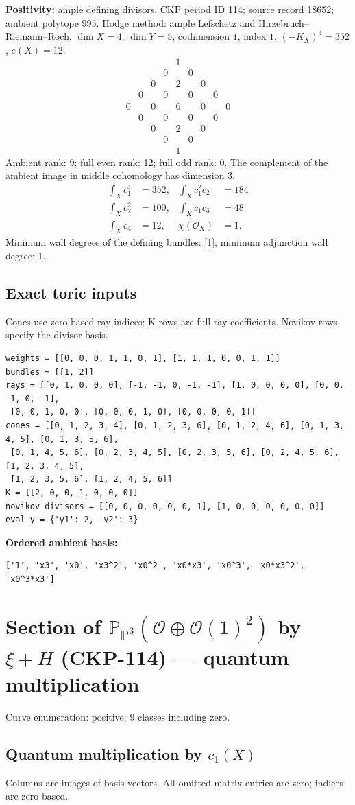 \documentclass[10pt,a4paper]{article}
\newcommand{\hodge}[4]{\begin{array}{ccccccccc}
&&&&1&&&&\\&&&0&&0&&&\\&&0&&#1&&0&&\\&0&&#2&&#2&&0&\\
0&&#3&&#4&&#3&&0\\&0&&#2&&#2&&0&\\&&0&&#1&&0&&\\&&&0&&0&&&\\&&&&1&&&&\end{array}}
\begin{document}
\textbf{Positivity:} ample defining divisors.
CKP period ID 114; source record 18652; ambient polytope 995.
Hodge method: ample Lefschetz and Hirzebruch--Riemann--Roch.
$\dim X=4$, $\dim Y=5$, codimension $1$, index $1$, $(-K_X)^4=352$, $e(X)=12$.
\[\hodge{2}{0}{0}{6}\]
Ambient rank: 9; full even rank: 12; full odd rank: 0. The complement of the ambient image in middle cohomology has dimension 3.
\[\begin{aligned}\int_Xc_1^4&=352,&\int_Xc_1^2c_2&=184\\\int_Xc_2^2&=100,&\int_Xc_1c_3&=48\\\int_Xc_4&=12,&\chi(\mathcal O_X)&=1.\end{aligned}\]
Minimum wall degrees of the defining bundles: [1]; minimum adjunction wall degree: 1.
\subsection*{Exact toric inputs}
Cones use zero-based ray indices; K rows are full ray coefficients. Novikov rows specify the divisor basis.

\begin{lstlisting}
weights = [[0, 0, 0, 1, 1, 0, 1], [1, 1, 1, 0, 0, 1, 1]]
bundles = [[1, 2]]
rays = [[0, 1, 0, 0, 0], [-1, -1, 0, -1, -1], [1, 0, 0, 0, 0], [0, 0, -1, 0, -1],
 [0, 0, 1, 0, 0], [0, 0, 0, 1, 0], [0, 0, 0, 0, 1]]
cones = [[0, 1, 2, 3, 4], [0, 1, 2, 3, 6], [0, 1, 2, 4, 6], [0, 1, 3, 4, 5], [0, 1, 3, 5, 6],
 [0, 1, 4, 5, 6], [0, 2, 3, 4, 5], [0, 2, 3, 5, 6], [0, 2, 4, 5, 6], [1, 2, 3, 4, 5],
 [1, 2, 3, 5, 6], [1, 2, 4, 5, 6]]
K = [[2, 0, 0, 1, 0, 0, 0]]
novikov_divisors = [[0, 0, 0, 0, 0, 0, 1], [1, 0, 0, 0, 0, 0, 0]]
eval_y = {'y1': 2, 'y2': 3}
\end{lstlisting}

\textbf{Ordered ambient basis:}
\begin{lstlisting}
['1', 'x3', 'x0', 'x3^2', 'x0^2', 'x0*x3', 'x0^3', 'x0*x3^2', 'x0^3*x3']
\end{lstlisting}

\clearpage\section*{Section of $\mathbb P_{\mathbb P^{3}}(\mathcal O\oplus \mathcal O(1)^{2})$ by $\xi +H$ (CKP-114) --- quantum multiplication}

Curve enumeration: positive; 9 classes including zero.
\subsection*{Quantum multiplication by $c_1(X)$}
Columns are images of basis vectors. All omitted matrix entries are zero; indices are zero based.
\end{document}
